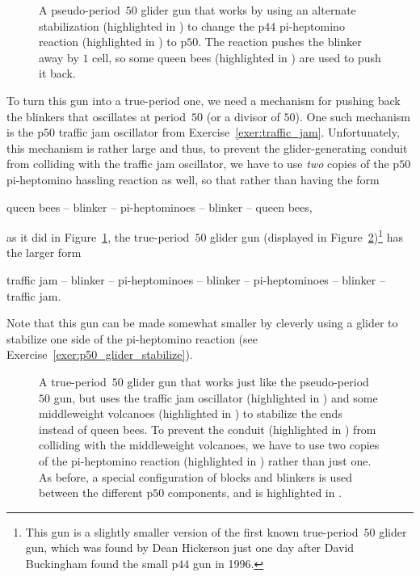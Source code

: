 \begin{figure}[!htb]
	\centering
	\caption{A pseudo-period~$50$ glider gun that works by using an alternate stabilization (highlighted in ) to change the p$44$ pi-heptomino reaction (highlighted in ) to p$50$. The reaction pushes the blinker away by $1$ cell, so some queen bees (highlighted in ) are used to push it back.}\label{fig:p50_glider_gun}
\end{figure}

To turn this gun into a true-period one, we need a mechanism for pushing back the blinkers that oscillates at period~$50$ (or a divisor of $50$). One such mechanism is the p$50$ traffic jam oscillator from Exercise~\ref{exer:traffic_jam}. Unfortunately, this mechanism is rather large and thus, to prevent the glider-generating conduit from colliding with the traffic jam oscillator, we have to use \emph{two} copies of the p$50$ pi-heptomino hassling reaction as well, so that rather than having the form

\begin{center}
	queen bees -- blinker -- pi-heptominoes -- blinker -- queen bees,
\end{center}

\noindent as it did in Figure~\ref{fig:p50_glider_gun}, the true-period~$50$ glider gun (displayed in Figure~\ref{fig:true_p50_glider_gun})\footnote{This gun is a slightly smaller version of the first known true-period~$50$ glider gun, which was found by Dean Hickerson just one day after David Buckingham found the small p$44$ gun in 1996.} has the larger form

\begin{center}
	traffic jam -- blinker -- pi-heptominoes -- blinker -- pi-heptominoes -- blinker -- traffic jam.
\end{center}

\noindent Note that this gun can be made somewhat smaller by cleverly using a glider to stabilize one side of the pi-heptomino reaction (see Exercise~\ref{exer:p50_glider_stabilize}).

\begin{figure}[!htb]
	\centering
	\caption{A true-period~$50$ glider gun that works just like the pseudo-period~$50$ gun, but uses the traffic jam oscillator (highlighted in ) and some middleweight volcanoes (highlighted in ) to stabilize the ends instead of queen bees. To prevent the conduit (highlighted in ) from colliding with the middleweight volcanoes, we have to use two copies of the pi-heptomino reaction (highlighted in ) rather than just one. As before, a special configuration of blocks and blinkers is used between the different p$50$ components, and is highlighted in .}\label{fig:true_p50_glider_gun}
\end{figure}

